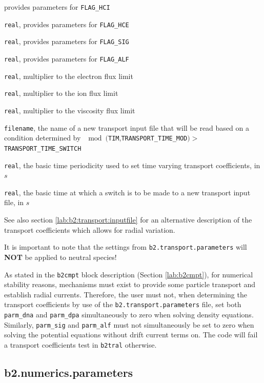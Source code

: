 \documentclass[a4paper,10pt]{report}
\begin{document}
\begin{description}
  provides parameters for {\tt FLAG\_HCI}
\item[PARM\_HCE] {\tt real},
  provides parameters for {\tt FLAG\_HCE}
\item[PARM\_SIG] {\tt real},
  provides parameters for {\tt FLAG\_SIG}
\item[PARM\_ALF] {\tt real},
  provides parameters for {\tt FLAG\_ALF}
\item[CFLME] {\tt real},
  multiplier to the electron flux limit
\item[CFLMI] {\tt real},
  multiplier to the ion flux limit
\item[CFLMV] {\tt real},
  multiplier to the viscosity flux limit
\item[TRANSPORT\_FILENAME] {\tt filename}, the name of a new
  transport input file that will be read based on a condition
  determined by $\mod(${\tt TIM},{\tt TRANSPORT\_TIME\_MOD}$)>${\tt TRANSPORT\_TIME\_SWITCH}
\item[TRANSPORT\_TIME\_MOD]  {\tt real},
  the basic time periodicity used to set time varying transport
  coefficients, in $s$
\item[TRANSPORT\_TIME\_SWITCH]
  {\tt real}, the basic time at which a switch is to be made to a new
  transport input file, in $s$
\end{description}
See also section \ref{lab:b2:transport:inputfile} for an alternative
description of the transport coefficients which allows for radial
variation.

It is important to note that the settings from {\tt b2.transport.parameters} will {\bf NOT} be applied to neutral species!

As stated in the {\tt b2cmpt} block description (Section \ref{lab:b2cmpt}),
for numerical stability reasons, mechanisms must exist to provide some
particle transport and establish radial currents. Therefore, the user
must not, when determining the transport coefficients by use of the
{\tt b2.transport.parameters} file, set both {\tt parm\_dna} and
{\tt parm\_dpa} simultaneously to zero when solving density equations.
Similarly, {\tt parm\_sig} and {\tt parm\_alf} must not simultaneously
be set to zero when solving the potential equations without drift current
terms on.
The code will fail a transport coefficients test in {\tt b2tral} otherwise.

\subsection{b2.numerics.parameters}
\label{lab:b2:numerics:parameters}
\end{document}
